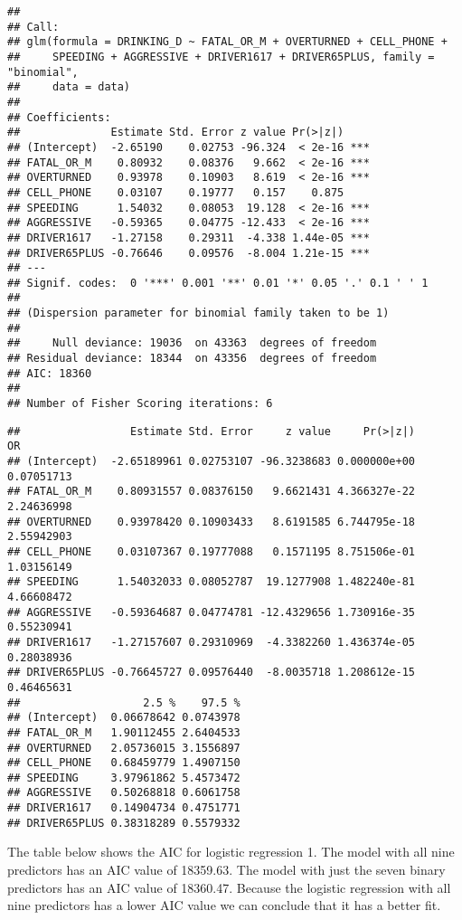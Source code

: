 \documentclass[
]{article}
\begin{document}
\begin{verbatim}
## 
## Call:
## glm(formula = DRINKING_D ~ FATAL_OR_M + OVERTURNED + CELL_PHONE + 
##     SPEEDING + AGGRESSIVE + DRIVER1617 + DRIVER65PLUS, family = "binomial", 
##     data = data)
## 
## Coefficients:
##              Estimate Std. Error z value Pr(>|z|)    
## (Intercept)  -2.65190    0.02753 -96.324  < 2e-16 ***
## FATAL_OR_M    0.80932    0.08376   9.662  < 2e-16 ***
## OVERTURNED    0.93978    0.10903   8.619  < 2e-16 ***
## CELL_PHONE    0.03107    0.19777   0.157    0.875    
## SPEEDING      1.54032    0.08053  19.128  < 2e-16 ***
## AGGRESSIVE   -0.59365    0.04775 -12.433  < 2e-16 ***
## DRIVER1617   -1.27158    0.29311  -4.338 1.44e-05 ***
## DRIVER65PLUS -0.76646    0.09576  -8.004 1.21e-15 ***
## ---
## Signif. codes:  0 '***' 0.001 '**' 0.01 '*' 0.05 '.' 0.1 ' ' 1
## 
## (Dispersion parameter for binomial family taken to be 1)
## 
##     Null deviance: 19036  on 43363  degrees of freedom
## Residual deviance: 18344  on 43356  degrees of freedom
## AIC: 18360
## 
## Number of Fisher Scoring iterations: 6
\end{verbatim}

\begin{verbatim}
##                 Estimate Std. Error     z value     Pr(>|z|)         OR
## (Intercept)  -2.65189961 0.02753107 -96.3238683 0.000000e+00 0.07051713
## FATAL_OR_M    0.80931557 0.08376150   9.6621431 4.366327e-22 2.24636998
## OVERTURNED    0.93978420 0.10903433   8.6191585 6.744795e-18 2.55942903
## CELL_PHONE    0.03107367 0.19777088   0.1571195 8.751506e-01 1.03156149
## SPEEDING      1.54032033 0.08052787  19.1277908 1.482240e-81 4.66608472
## AGGRESSIVE   -0.59364687 0.04774781 -12.4329656 1.730916e-35 0.55230941
## DRIVER1617   -1.27157607 0.29310969  -4.3382260 1.436374e-05 0.28038936
## DRIVER65PLUS -0.76645727 0.09576440  -8.0035718 1.208612e-15 0.46465631
##                   2.5 %    97.5 %
## (Intercept)  0.06678642 0.0743978
## FATAL_OR_M   1.90112455 2.6404533
## OVERTURNED   2.05736015 3.1556897
## CELL_PHONE   0.68459779 1.4907150
## SPEEDING     3.97961862 5.4573472
## AGGRESSIVE   0.50268818 0.6061758
## DRIVER1617   0.14904734 0.4751771
## DRIVER65PLUS 0.38318289 0.5579332
\end{verbatim}

The table below shows the AIC for logistic regression 1. The model with
all nine predictors has an AIC value of 18359.63. The model with just
the seven binary predictors has an AIC value of 18360.47. Because the
logistic regression with all nine predictors has a lower AIC value we
can conclude that it has a better fit.
\end{document}
